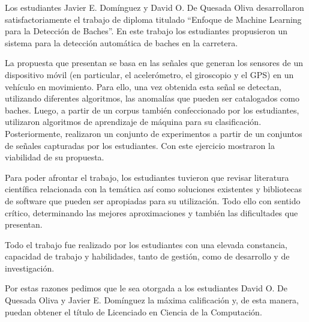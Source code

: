 \begin{opinion}
    Los estudiantes Javier E. Domínguez y David O. De Quesada Oliva desarrollaron satisfactoriamente el trabajo de diploma titulado 
    “Enfoque de Machine Learning para la Detección de Baches”. En este trabajo los estudiantes propusieron un sistema para 
    la detección automática de baches en la carretera.

    La propuesta que presentan se basa en las señales que generan los sensores de un dispositivo móvil (en particular, el acelerómetro, 
    el giroscopio y el GPS) en un vehículo en movimiento. Para ello, una vez obtenida esta señal se detectan, utilizando diferentes algoritmos, 
    las anomalías que pueden ser catalogados como baches. Luego, a partir de un corpus también confeccionado por los estudiantes, 
    utilizaron algoritmos de aprendizaje de máquina para su clasificación. Posteriormente, realizaron un conjunto de experimentos a 
    partir de un conjuntos de señales capturadas por los estudiantes. Con este ejercicio mostraron la viabilidad de su propuesta.


    Para poder afrontar el trabajo, los estudiantes tuvieron que revisar literatura científica relacionada con la temática así como soluciones 
    existentes y bibliotecas de software que pueden ser apropiadas para su utilización. Todo ello con sentido crítico, determinando 
    las mejores aproximaciones y también las dificultades que presentan.

    Todo el trabajo fue realizado por los estudiantes con una elevada constancia, capacidad de trabajo y habilidades, tanto de gestión, como 
    de desarrollo y de investigación. 

    Por estas razones pedimos que le sea otorgada a los estudiantes David O. De Quesada Oliva y Javier E. Domínguez la máxima calificación y, 
    de esta manera,  puedan obtener el título de Licenciado en Ciencia de la Computación.


\end{opinion}
